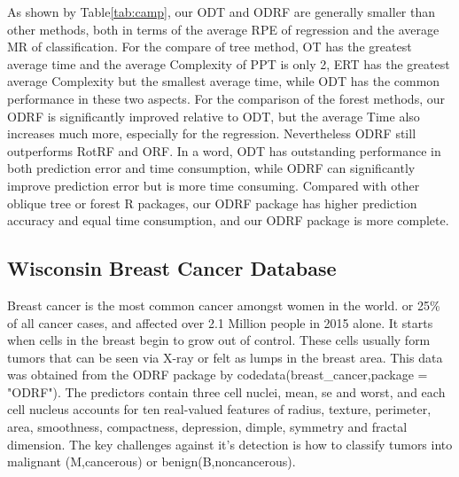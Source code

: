 \documentclass[nojss]{jss}
\numberwithin{equation}{section}
\begin{document}
As shown by Table\ref{tab:camp}, our ODT and ODRF are generally smaller than other methods, both in terms of the average RPE of regression and the average MR of classification. For the compare of tree method, OT has the greatest average time and the average Complexity of PPT is only 2, ERT has the greatest average Complexity but the smallest average time, while ODT has the common performance in these two aspects. For the comparison of the forest methods, our ODRF is significantly improved relative to ODT, but the average Time also increases much more, especially for the regression. Nevertheless ODRF still outperforms RotRF and ORF. In a word, ODT has outstanding performance in both prediction error and time consumption, while ODRF can significantly improve prediction error but is more time consuming. Compared with other oblique tree or forest R packages, our ODRF package has higher prediction accuracy and equal time consumption, and our ODRF package is more complete.


\subsection{Wisconsin Breast Cancer Database}
Breast cancer is the most common cancer amongst women in the world. or 25\% of all cancer cases, and affected over 2.1 Million people in 2015 alone. It starts when cells in the breast begin to grow out of control. These cells usually form tumors that can be seen via X-ray or felt as lumps in the breast area. This data was obtained from the ODRF package by code{data(breast\_cancer,package = "ODRF")}. The predictors contain three cell nuclei, mean, se and worst, and each cell nucleus accounts for ten real-valued features of radius, texture, perimeter, area, smoothness, compactness, depression, dimple, symmetry and fractal dimension. The key challenges against it's detection is how to classify tumors into malignant (M,cancerous) or benign(B,noncancerous).
\end{document}
